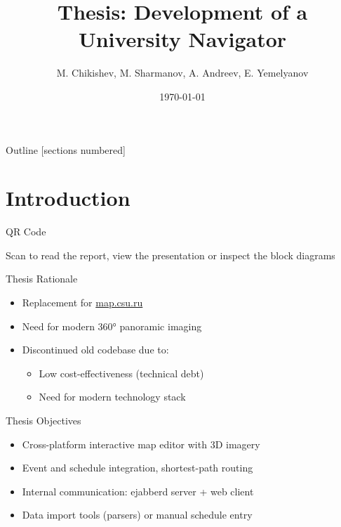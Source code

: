\documentclass[10pt, aspectratio=169]{beamer}
\title{Thesis: Development of a University Navigator}
\author{M. Chikishev, M. Sharmanov, A. Andreev, E. Yemelyanov}
\institute{Chelyabinsk State University}
\date{\today}
\begin{document}
\begin{frame}[plain]
	\titlepage
\end{frame}

\begin{frame}{Outline}
	[sections numbered]
	\tableofcontents[hideallsubsections]
\end{frame}

\section{Introduction}
\begin{frame}{QR Code}
	\centering

	\vspace{1em}


	\small{Scan to read the report, view the presentation or inspect the block diagrams}
\end{frame}

\begin{frame}{Thesis Rationale}
	\begin{itemize}
		\item Replacement for \href{https://map.csu.ru}{map.csu.ru}
		\item Need for modern 360° panoramic imaging
		\item Discontinued old codebase due to:
		      \begin{itemize}
			      \item Low cost-effectiveness (technical debt)
			      \item Need for modern technology stack
		      \end{itemize}
	\end{itemize}
\end{frame}

\begin{frame}{Thesis Objectives}
	\begin{itemize}
		\item Cross-platform interactive map editor with 3D imagery
		\item Event and schedule integration, shortest-path routing
		\item Internal communication: ejabberd server + web client
		\item Data import tools (parsers) or manual schedule entry
	\end{itemize}
\end{frame}
\end{document}
